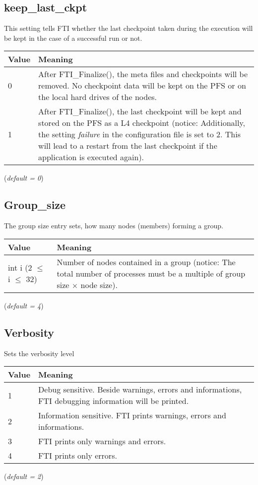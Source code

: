\documentclass{refrep}
\begin{document}
\subsection{keep\_last\_ckpt}\label{subsec:keeplastckpt}
This setting tells FTI whether the last checkpoint taken during the execution will be kept in the case of a successful run or not.
\begin{center}
\begin{tabular}[h!]{|p{}|p{}|}
\hline
\textbf{Value} & \textbf{Meaning} \\ \hline
0 & After {\asciifamily FTI\_Finalize()}, the meta files and checkpoints will be removed. No checkpoint data will be kept on the PFS or on the local hard drives of the nodes.  \\ \hline
1 & After {\asciifamily FTI\_Finalize()}, the last checkpoint will be kept and stored on the PFS as a L4 checkpoint (notice: Additionally, the setting \emph{failure} in the configuration file is set to 2. This will lead to a restart from the last checkpoint if the application is executed again).  \\ \hline
\end{tabular}
\end{center}
(\textit{default = 0})
\subsection{Group\_size}\label{subsec:groupsize}
The group size entry sets, how many nodes (members) forming a group.
\begin{center}
\begin{tabular}[h!]{|p{}|p{}|}
\hline
\textbf{Value} & \textbf{Meaning} \\ \hline
int i (2 $\leq$ i $\leq$ 32) & Number of nodes contained in a group (notice: The total number of processes must be a multiple of group size $\times$ node size). \\ \hline
\end{tabular}
\end{center}
(\textit{default = 4})
\subsection{Verbosity}\label{subsec:verbosity}
Sets the verbosity level
\begin{center}
\begin{tabular}[h!]{|p{}|p{}|}
\hline
\textbf{Value} & \textbf{Meaning} \\ \hline
1 & Debug sensitive. Beside warnings, errors and informations, FTI debugging information will be printed.  \\ \hline
2 & Information sensitive. FTI prints warnings, errors and informations. \\ \hline
3 & FTI prints only warnings and errors.  \\ \hline
4 & FTI prints only errors.  \\ \hline
\end{tabular}
\end{center}
(\textit{default = 2})
\end{document}
